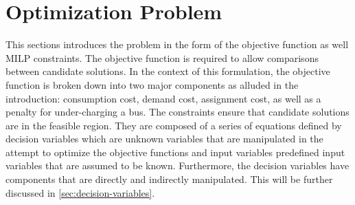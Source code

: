 \documentclass[11pt,a4paper,final]{article}
\begin{document}
\section{Optimization Problem}
\label{optimization-problem}
This sections introduces the problem in the form of the objective function as well MILP constraints. The objective
function is required to allow comparisons between candidate solutions. In the context of this formulation, the objective
function is broken down into two major components as alluded in the introduction: consumption cost, demand cost,
assignment cost, as well as a penalty for under-charging a bus. The constraints ensure that candidate solutions are in
the feasible region. They are composed of a series of equations defined by decision variables which are unknown
variables that are manipulated in the attempt to optimize the objective functions and input variables predefined input
variables that are assumed to be known. Furthermore, the decision variables have components that are directly and
indirectly manipulated. This will be further discussed in \ref{sec:decision-variables}.
\end{document}
